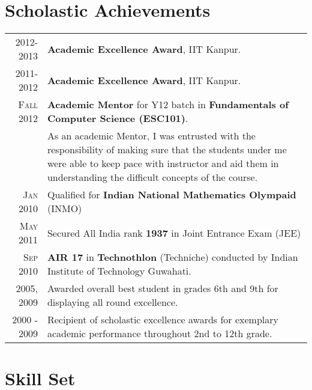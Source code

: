 \documentclass[a4paper,10pt]{article} %
\begin{document}
\section{Scholastic Achievements}

\begin{tabular}{rp{12cm}}

    \textsc{2012-2013}   & \textbf{Academic Excellence Award}, IIT Kanpur. \\
    \textsc{2011-2012}   & \textbf{Academic Excellence Award}, IIT Kanpur. \\
    \textsc{Fall 2012}   & \textbf{Academic Mentor} for Y12 batch in \textbf{Fundamentals of Computer Science (ESC101)}. \\
                         & \footnotesize{As an academic Mentor, I was entrusted with the responsibility of making sure
                            that the students under me were able to keep pace with instructor and aid them in understanding
                            the difficult concepts of the course. }\\
    \textsc{Jan 2010}    & Qualified for \textbf{Indian National Mathematics Olympaid} (INMO) \\
    \textsc{May 2011}    & Secured All India rank \textbf{1937} in Joint Entrance Exam (JEE) \\
    \textsc{Sep 2010}    & \textbf{AIR 17} in \textbf{Technothlon} (Techniche) conducted by Indian Institute of Technology Guwahati. \\
    \textsc{2005, 2009}  & Awarded overall best student in grades 6th and 9th for displaying all round excellence. \\
    \textsc{2000 - 2009} & Recipient of scholastic excellence awards for exemplary academic performance throughout 2nd to 12th grade. \\

\end{tabular}

\section{Skill Set}
\end{document}
